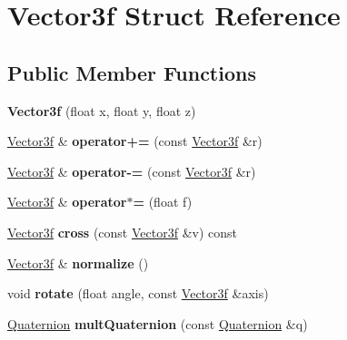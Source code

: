 \hypertarget{struct_vector3f}{\section{Vector3f Struct Reference}
\label{struct_vector3f}
}
\subsection*{Public Member Functions}
\begin{DoxyCompactItemize}
\item 
\hypertarget{struct_vector3f_a71033a308401bb8950d846a012d13da8}{{\bfseries Vector3f} (float x, float y, float z)}\label{struct_vector3f_a71033a308401bb8950d846a012d13da8}

\item 
\hypertarget{struct_vector3f_abb9089cd5b410ea28b1d1db63fc550f8}{\hyperlink{struct_vector3f}{Vector3f} \& {\bfseries operator+=} (const \hyperlink{struct_vector3f}{Vector3f} \&r)}\label{struct_vector3f_abb9089cd5b410ea28b1d1db63fc550f8}

\item 
\hypertarget{struct_vector3f_a63ec561fd67ea011aa973c0549d48a26}{\hyperlink{struct_vector3f}{Vector3f} \& {\bfseries operator-\/=} (const \hyperlink{struct_vector3f}{Vector3f} \&r)}\label{struct_vector3f_a63ec561fd67ea011aa973c0549d48a26}

\item 
\hypertarget{struct_vector3f_a0449c07194a079d3eb57961e374e96ee}{\hyperlink{struct_vector3f}{Vector3f} \& {\bfseries operator$\ast$=} (float f)}\label{struct_vector3f_a0449c07194a079d3eb57961e374e96ee}

\item 
\hypertarget{struct_vector3f_a7717b09f2b9726b066c782f3b3971459}{\hyperlink{struct_vector3f}{Vector3f} {\bfseries cross} (const \hyperlink{struct_vector3f}{Vector3f} \&v) const }\label{struct_vector3f_a7717b09f2b9726b066c782f3b3971459}

\item 
\hypertarget{struct_vector3f_a66638cd1b6441426b3126798db40f557}{\hyperlink{struct_vector3f}{Vector3f} \& {\bfseries normalize} ()}\label{struct_vector3f_a66638cd1b6441426b3126798db40f557}

\item 
\hypertarget{struct_vector3f_a3c7dfad000e1a1b6e4f3dde70b27c3e7}{void {\bfseries rotate} (float angle, const \hyperlink{struct_vector3f}{Vector3f} \&axis)}\label{struct_vector3f_a3c7dfad000e1a1b6e4f3dde70b27c3e7}

\item 
\hypertarget{struct_vector3f_a969377514bb86a32a10aa38c45f7989f}{\hyperlink{struct_quaternion}{Quaternion} {\bfseries mult\-Quaternion} (const \hyperlink{struct_quaternion}{Quaternion} \&q)}\label{struct_vector3f_a969377514bb86a32a10aa38c45f7989f}

\end{DoxyCompactItemize}
